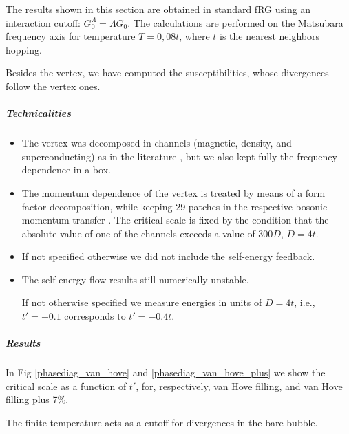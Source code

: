 The results shown in this section are obtained in standard fRG using an interaction cutoff: $G_0^\Lambda = \Lambda G_0$. The calculations are performed on the Matsubara frequency axis for temperature $T=0,08 t$, where $t$ is the nearest neighbors hopping.  

Besides the vertex, we have computed the susceptibilities, whose divergences follow the vertex ones. 

\subparagraph{Technicalities}
\begin{itemize} 

\item The vertex was decomposed in channels (magnetic, density, and superconducting) as in the literature \cite{Husemann2009, Husemann2012}, but we also kept fully the frequency dependence in a box. 

\item The momentum dependence of the vertex is treated by means of a form factor decomposition, while keeping 29 patches in the respective bosonic momentum transfer . The critical scale is fixed by the condition that the absolute value of one of the channels exceeds a value of 300$D$, $D=4t$. 


\item If not specified otherwise we did not include the self-energy feedback. 

\item The self energy flow results still numerically unstable.  
 
If not otherwise specified we measure energies in units of $D=4t$, i.e., $t'=-0.1$ corresponds to $t'=-0.4t$.
\end{itemize} 
 
\subparagraph{Results} 

In Fig \ref{phasediag_van_hove} and \ref{phasediag_van_hove_plus} we show  the critical scale as a function of $t'$, for, respectively, van Hove filling, and van Hove filling plus 7\%.    

The finite temperature acts as a cutoff for divergences in the bare bubble. 


